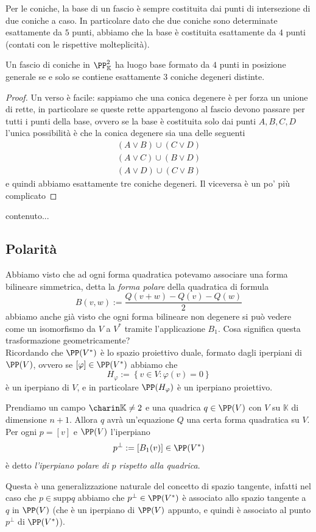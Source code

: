 \documentclass[11pt]{scrartcl}
\newcommand{\KK}{\mathbb{K}}
\begin{document}
	Per le coniche, la base di un fascio è sempre costituita dai punti di intersezione di due coniche a caso. In particolare dato che due coniche sono determinate esattamente da $5$ punti, abbiamo che la base è costituita esattamente da $4$ punti (contati con le rispettive molteplicità).
	\begin{proposition}
		Un fascio di coniche in $\PP^2_\KK$ ha luogo base formato da $4$ punti in posizione generale se e solo se contiene esattamente $3$ coniche degeneri distinte.
	\end{proposition}
	\begin{proof}
		Un verso è facile: sappiamo che una conica degenere è per forza un unione di rette, in particolare se queste rette appartengono al fascio devono passare per tutti i punti della base, ovvero se la base è costituita solo dai punti $A,B,C,D$ l'unica possibilità è che la conica degenere sia una delle seguenti
		\begin{gather*}
			\left(A\lor B\right)\cup \left(C\lor D\right) \\
			\left(A\lor C\right)\cup \left(B\lor D\right) \\
			\left(A\lor D\right)\cup \left(C\lor B\right)
		\end{gather*}
		e quindi abbiamo esattamente tre coniche degeneri. Il viceversa è un po' più complicato
	\end{proof}
	\begin{definition}
		contenuto...
	\end{definition}
	\subsection{Polarità}
	Abbiamo visto che ad ogni forma quadratica potevamo associare una forma bilineare simmetrica, detta la \textit{forma polare} della quadratica di formula
	$$B(v,w):=\frac{Q(v+w)-Q(v)-Q(w)}{2}$$
	abbiamo anche già visto che ogni forma bilineare non degenere si può vedere come un isomorfismo da $V$ a $V^*$ tramite l'applicazione $B_1$. Cosa significa questa trasformazione geometricamente? \\
	Ricordando che $\PP(V^*)$ è lo spazio proiettivo duale, formato dagli iperpiani di $\PP(V)$, ovvero se $[\varphi]\in \PP(V^*)$ abbiamo che
	$$H_\varphi:=\left\{v\in V:\varphi(v)=0\right\}$$
	è un iperpiano di $V$, e in particolare $\PP(H_\varphi)$ è un iperpiano proiettivo.
	\begin{definition}
		Prendiamo un campo $\charin \KK\ne 2$ e una quadrica $q\in \PP(V)$ con $V$ su $\KK$ di dimensione $n+1$. Allora $q$ avrà un'equazione $Q$ una certa forma quadratica su $V$. Per ogni $p=[v]$ e $\PP(V)$ l'iperpiano
		$$p^\perp:= [B_1(v)]\in \PP(V^*)$$
		è detto \textit{l'iperpiano polare di $p$ rispetto alla quadrica}.
	\end{definition}
	Questa è una generalizzazione naturale del concetto di spazio tangente, infatti nel caso che $p\in \text{supp}q$ abbiamo che $p^\perp\in \PP(V^*)$ è associato allo spazio tangente a $q$ in $\PP(V)$ (che è un iperpiano di $\PP(V)$ appunto, e quindi è associato al punto $p^\perp$ di $\PP(V^*)$).
	
\end{document}
